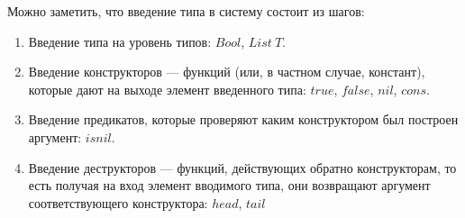 \begin{itemize}
   \begin{prooftree}
   \end{prooftree}
   \begin{prooftree}
   \end{prooftree}
   \begin{prooftree}
   \end{prooftree}
   \begin{prooftree}
   \end{prooftree}
   \begin{prooftree}
   \end{prooftree}
   \begin{prooftree}
   \end{prooftree}
   \begin{prooftree}
   \end{prooftree}
   \begin{prooftree}
   \end{prooftree}
\end{itemize}

Можно заметить, что введение типа в систему состоит из шагов\label{introducing-type}:
\begin{enumerate}
\item Введение типа на уровень типов: \(Bool\), \(List\ T\).
\item Введение конструкторов --- функций (или, в частном
   случае, констант), которые дают на выходе элемент
   введенного типа: \(true\), \(false\), \(nil\), \(cons\).
\item Введение предикатов, которые проверяют каким конструктором
   был построен аргумент: \(isnil\).
\item Введение деструкторов --- функций, действующих обратно
   конструкторам, то есть получая на вход элемент вводимого типа,
   они возвращают аргумент соответствующего конструктора:
   \(head\), \(tail\)
\end{enumerate}

